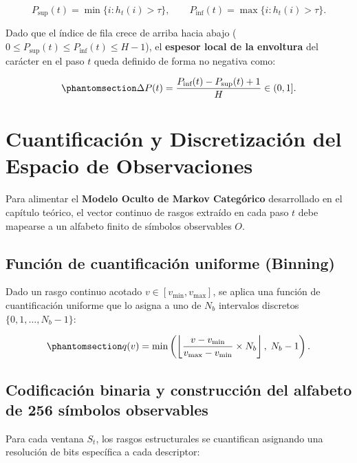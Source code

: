 \documentclass[
  spanish,
  us-letterpaper,
]{scrreprt}
\theoremstyle{definition}
\theoremstyle{remark}
\begin{document}
\[
P_{\text{sup}}(t) = \min \{ i : h_t(i) > \tau \}, \qquad P_{\text{inf}}(t) = \max \{ i : h_t(i) > \tau \}.
\]

Dado que el índice de fila crece de arriba hacia abajo
(\(0 \le P_{\text{sup}}(t) \le P_{\text{inf}}(t) \le H - 1\)), el
\textbf{espesor local de la envoltura} del carácter en el paso \(t\)
queda definido de forma no negativa como:

\begin{equation}\phantomsection\label{eq-espesor-envoltura}{
\Delta P(t) = \frac{P_{\text{inf}}(t) - P_{\text{sup}}(t) + 1}{H} \in (0, 1].
}\end{equation}

\section{Cuantificación y Discretización del Espacio de
Observaciones}\label{cuantificaciuxf3n-y-discretizaciuxf3n-del-espacio-de-observaciones}

Para alimentar el \textbf{Modelo Oculto de Markov Categórico}
desarrollado en el capítulo teórico, el vector continuo de rasgos
extraído en cada paso \(t\) debe mapearse a un alfabeto finito de
símbolos observables \(O\).

\subsection{Función de cuantificación uniforme
(Binning)}\label{funciuxf3n-de-cuantificaciuxf3n-uniforme-binning}

Dado un rasgo continuo acotado \(v \in [v_{\min}, v_{\max}]\), se aplica
una función de cuantificación uniforme que lo asigna a uno de \(N_b\)
intervalos discretos \(\{0, 1, \dots, N_b - 1\}\):

\begin{equation}\phantomsection\label{eq-binning}{
q(v) = \min\left( \left\lfloor \frac{v - v_{\min}}{v_{\max} - v_{\min}} \times N_b \right\rfloor,\; N_b - 1 \right).
}\end{equation}

\subsection{Codificación binaria y construcción del alfabeto de 256
símbolos
observables}\label{codificaciuxf3n-binaria-y-construcciuxf3n-del-alfabeto-de-256-suxedmbolos-observables}

Para cada ventana \(S_t\), los rasgos estructurales se cuantifican
asignando una resolución de bits específica a cada descriptor:
\end{document}
